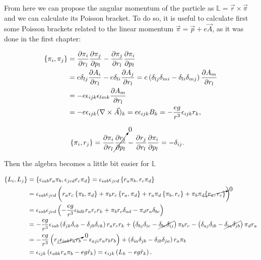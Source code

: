 From here we can propose the angular momentum of the particle as $\mathbb{L}= \vec{r}\times\vec{\pi}$ and we can calculate its Poisson bracket. To do so, it is useful to calculate first some Poisson brackets related to the linear momentum $\vec{\pi} = \vec{p} + e\vec{A}$, as it was done in the first chapter:


\begin{align*}
\left\lbrace \pi_i, \pi_j \right\rbrace &= \frac{\partial \pi_i}{\partial r_l}\frac{\partial \pi_j}{\partial p_l} - \frac{\partial \pi_j}{\partial r_l}\frac{\partial \pi_i}{\partial p_l}\\
&= e\delta_{lj}\frac{\partial A_i}{\partial r_l} -e\delta_{li}\frac{\partial A_j}{\partial r_l}            = e\left( \delta_{lj}\delta_{mi} - \delta_{li}\delta_{mj} \right)\frac{\partial A_m}{\partial r_l} \\
&= -e\epsilon_{ijk}\epsilon_{lmk}\frac{\partial A_m}{\partial r_l}\\
&= -e\epsilon_{ijk}(\nabla \times \vec{A})_k = e\epsilon_{ijk}B_k = -\frac{eg}{r^3}\epsilon_{ijk}r_k,
\end{align*}

\begin{align*}
\left\lbrace \pi_i, r_j \right\rbrace &= \frac{\partial \pi_i}{\partial r_l}\cancelto{0}{\frac{\partial r_j}{\partial p_l}} - \frac{\partial r_j}{\partial r_l}\frac{\partial \pi_i}{\partial p_l} =  -\delta_{ij}.
\end{align*}

Then the algebra becomes a little bit easier for $\mathbb{L}$

\begin{align*}
\left\lbrace L_i, L_j \right\rbrace &= \left\lbrace \epsilon_{iab}r_a\pi_b, \epsilon_{jcd}r_c\pi_d \right\rbrace = \epsilon_{iab}\epsilon_{jcd}\left\lbrace r_a\pi_b, r_c\pi_d \right\rbrace\\
&= \epsilon_{iab}\epsilon_{jcd}\left( r_ar_c\left\lbrace \pi_b, \pi_d \right\rbrace+\pi_br_c\left\lbrace r_a, \pi_d \right\rbrace            +r_a\pi_d\left\lbrace \pi_b, r_c \right\rbrace + \pi_b\pi_d\cancelto{0}{\left\lbrace r_a, r_c \right\rbrace} \right)\\
&= \epsilon_{iab}\epsilon_{jcd}\left( -\frac{eg}{r^3}\epsilon_{bdk}r_ar_cr_k+\pi_br_c\delta_{ad}-\pi_dr_a\delta_{bc} \right)\\
&= -\frac{eg}{r^3}\epsilon_{iab}\left( \delta_{jk}\delta_{cb} - \delta_{jb}\delta_{ck} \right)r_ar_cr_k + \left( \delta_{bj}\delta_{ic} - \cancel{\delta_{bc}\delta_{ij}} \right)\pi_br_c - \left( \delta_{aj}\delta_{ib} - \cancel{\delta_{ia}\delta_{jb}} \right)\pi_dr_a\\
& = -\frac{eg}{r^3}\left( r_j\cancelto{0}{\epsilon_{iab}r_ar_b}-\epsilon_{aji}r_a{r_br_b} \right)             +\left( \delta_{ia}\delta_{jb}-\delta_{ib}\delta_{ja} \right)r_a\pi_b\\
& = \epsilon_{ijk}\left( \epsilon_{abk}r_a\pi_b-{eg}\hat{r}_k \right) = \epsilon_{ijk}\left( L_k-{eg}\hat{r}_k \right).
\end{align*}

